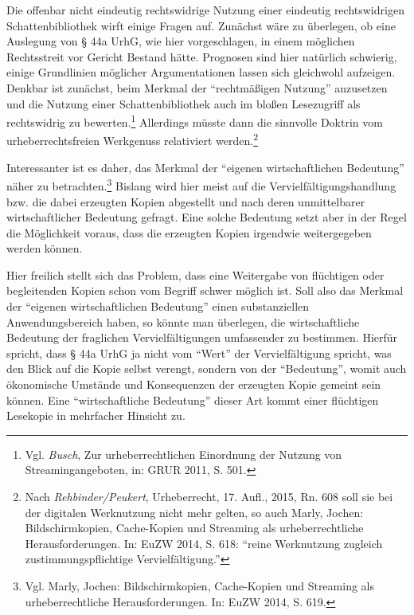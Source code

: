 \documentclass[a4paper,
fontsize=11pt,
oneside,
numbers=noperiodatend,
parskip=half-,
bibliography=totoc,
final
]{scrartcl}
\begin{document}
Die offenbar nicht eindeutig rechtswidrige Nutzung einer eindeutig
rechtswidrigen Schattenbibliothek wirft einige Fragen auf. Zunächst wäre
zu überlegen, ob eine Auslegung von § 44a UrhG, wie hier vorgeschlagen,
in einem möglichen Rechtsstreit vor Gericht Bestand hätte. Prognosen
sind hier natürlich schwierig, einige Grundlinien möglicher
Argumentationen lassen sich gleichwohl aufzeigen. Denkbar ist zunächst,
beim Merkmal der \enquote{rechtmäßigen Nutzung} anzusetzen und die
Nutzung einer Schattenbibliothek auch im bloßen Lesezugriff als
rechtswidrig zu bewerten.\footnote{Vgl. \emph{Busch}, Zur
  urheberrechtlichen Einordnung der Nutzung von Streamingangeboten, in:
  GRUR 2011, S. 501.} Allerdings müsste dann die sinnvolle Doktrin vom
urheberrechtsfreien Werkgenuss relativiert werden.\footnote{Nach
  \emph{Rehbinder/Peukert}, Urheberrecht, 17. Aufl., 2015, Rn. 608 soll
  sie bei der digitalen Werk­nutzung nicht mehr gelten, so auch Marly,
  Jochen: Bildschirmkopien, Cache-Kopien und Streaming als
  urheberrechtliche Herausforderungen. In: EuZW 2014, S. 618:
  \enquote{reine Werknutzung zugleich zustimmungspflichtige
  Vervielfältigung.}}

Interessanter ist es daher, das Merkmal der \enquote{eigenen
wirtschaftlichen Bedeutung} näher zu betrachten.\footnote{Vgl. Marly,
  Jochen: Bildschirmkopien, Cache-Kopien und Streaming als
  urheberrechtliche Heraus­forderungen. In: EuZW 2014, S. 619.} Bislang
wird hier meist auf die Vervielfältigungshandlung bzw. die dabei
erzeugten Kopien abgestellt und nach deren unmittelbarer
wirtschaftlicher Bedeutung gefragt. Eine solche Bedeutung setzt aber in
der Regel die Möglichkeit voraus, dass die erzeugten Kopien irgendwie
weitergegeben werden können.

Hier freilich stellt sich das Problem, dass eine Weitergabe von
flüchtigen oder begleitenden Kopien schon vom Begriff schwer möglich
ist. Soll also das Merkmal der \enquote{eigenen wirtschaftlichen
Bedeutung} einen substanziellen Anwendungsbereich haben, so könnte man
überlegen, die wirtschaftliche Bedeutung der fraglichen
Vervielfältigungen umfassender zu bestimmen. Hierfür spricht, dass § 44a
UrhG ja nicht vom \enquote{Wert} der Vervielfältigung spricht, was den
Blick auf die Kopie selbst verengt, sondern von der \enquote{Bedeutung},
womit auch ökonomische Umstände und Konsequenzen der erzeugten Kopie
gemeint sein können. Eine \enquote{wirtschaftliche Bedeutung} dieser Art
kommt einer flüchtigen Lesekopie in mehrfacher Hinsicht zu.
\end{document}
